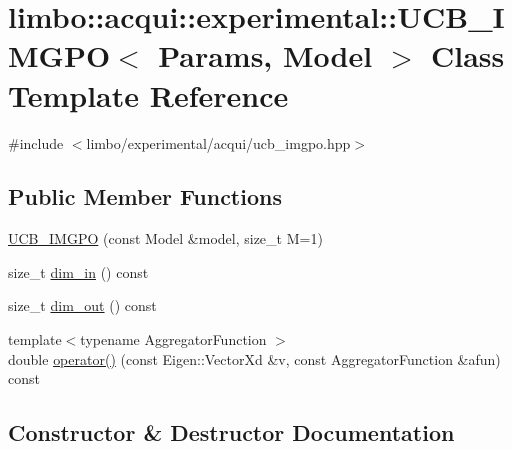 \hypertarget{classlimbo_1_1acqui_1_1experimental_1_1_u_c_b___i_m_g_p_o}{}\section{limbo\+:\+:acqui\+:\+:experimental\+:\+:U\+C\+B\+\_\+\+I\+M\+G\+PO$<$ Params, Model $>$ Class Template Reference}
\label{classlimbo_1_1acqui_1_1experimental_1_1_u_c_b___i_m_g_p_o}


{\ttfamily \#include $<$limbo/experimental/acqui/ucb\+\_\+imgpo.\+hpp$>$}

\subsection*{Public Member Functions}
\begin{DoxyCompactItemize}
\item 
\hyperlink{classlimbo_1_1acqui_1_1experimental_1_1_u_c_b___i_m_g_p_o_a13c9d89758fe241c051fafe06337fd1e}{U\+C\+B\+\_\+\+I\+M\+G\+PO} (const Model \&model, size\+\_\+t M=1)
\item 
size\+\_\+t \hyperlink{classlimbo_1_1acqui_1_1experimental_1_1_u_c_b___i_m_g_p_o_ac773917d0802053632cd37e7885fe282}{dim\+\_\+in} () const 
\item 
size\+\_\+t \hyperlink{classlimbo_1_1acqui_1_1experimental_1_1_u_c_b___i_m_g_p_o_ad6b61ac04acf5a268eb7fef4a879bc31}{dim\+\_\+out} () const 
\item 
{\footnotesize template$<$typename Aggregator\+Function $>$ }\\double \hyperlink{classlimbo_1_1acqui_1_1experimental_1_1_u_c_b___i_m_g_p_o_a4f0d0671883e2d3a9a501e95c091098f}{operator()} (const Eigen\+::\+Vector\+Xd \&v, const Aggregator\+Function \&afun) const 
\end{DoxyCompactItemize}


\subsection{Constructor \& Destructor Documentation}
